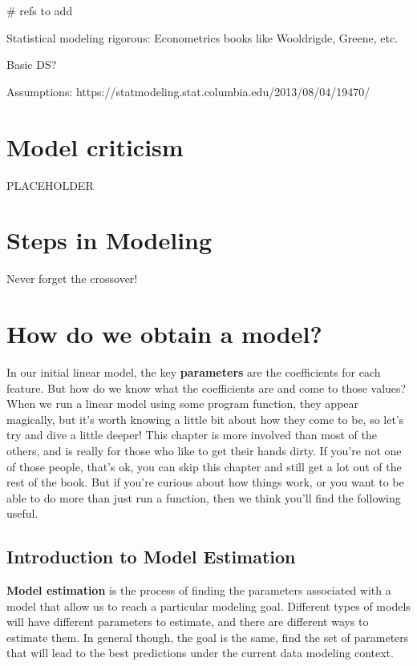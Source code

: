 \documentclass[
  letterpaper,
]{krantz}
\begin{document}
\# refs to add

Statistical modeling rigorous: Econometrics books like Wooldrigde,
Greene, etc.

Basic DS?

Assumptions: https://statmodeling.stat.columbia.edu/2013/08/04/19470/

\chapter{Model criticism}\label{model-criticism}

PLACEHOLDER

\chapter{Steps in Modeling}\label{steps-in-modeling}

Never forget the crossover!

\chapter{How do we obtain a model?}\label{how-do-we-obtain-a-model}

In our initial linear model, the key \textbf{parameters} are the
coefficients for each feature. But how do we know what the coefficients
are and come to those values? When we run a linear model using some
program function, they appear magically, but it's worth knowing a little
bit about how they come to be, so let's try and dive a little deeper!
This chapter is more involved than most of the others, and is really for
those who like to get their hands dirty. If you're not one of those
people, that's ok, you can skip this chapter and still get a lot out of
the rest of the book. But if you're curious about how things work, or
you want to be able to do more than just run a function, then we think
you'll find the following useful.

\section{Introduction to Model
Estimation}\label{introduction-to-model-estimation}

\textbf{Model estimation} is the process of finding the parameters
associated with a model that allow us to reach a particular modeling
goal. Different types of models will have different parameters to
estimate, and there are different ways to estimate them. In general
though, the goal is the same, find the set of parameters that will lead
to the best predictions under the current data modeling context.
\end{document}
